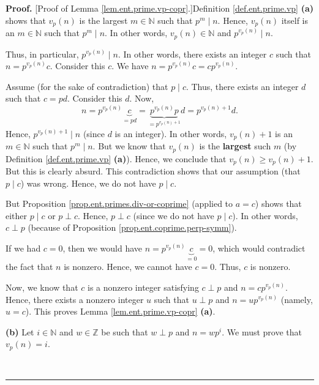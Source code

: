 \documentclass[numbers=enddot,12pt,final,onecolumn,notitlepage]{scrartcl}%
\numberwithin{exer}{subsection}
\theoremstyle{definition}
\newenvironment{proof}[1][Proof]{\noindent\textbf{#1.} }{\ \rule{0.5em}{0.5em}}
\begin{document}
\begin{proof}
[Proof of Lemma \ref{lem.ent.prime.vp-copr}.]Definition \ref{def.ent.prime.vp}
\textbf{(a)} shows that $v_{p}\left(  n\right)  $ is the largest
$m\in\mathbb{N}$ such that $p^{m}\mid n$. Hence, $v_{p}\left(  n\right)  $
itself is an $m\in\mathbb{N}$ such that $p^{m}\mid n$. In other words,
$v_{p}\left(  n\right)  \in\mathbb{N}$ and $p^{v_{p}\left(  n\right)  }\mid n$.

Thus, in particular, $p^{v_{p}\left(  n\right)  }\mid n$. In other words,
there exists an integer $c$ such that $n=p^{v_{p}\left(  n\right)  }c$.
Consider this $c$. We have $n=p^{v_{p}\left(  n\right)  }c=cp^{v_{p}\left(
n\right)  }$.

Assume (for the sake of contradiction) that $p\mid c$. Thus, there exists an
integer $d$ such that $c=pd$. Consider this $d$. Now,%
\[
n=p^{v_{p}\left(  n\right)  }\underbrace{c}_{=pd}=\underbrace{p^{v_{p}\left(
n\right)  }p}_{=p^{v_{p}\left(  n\right)  +1}}d=p^{v_{p}\left(  n\right)
+1}d.
\]
Hence, $p^{v_{p}\left(  n\right)  +1}\mid n$ (since $d$ is an integer). In
other words, $v_{p}\left(  n\right)  +1$ is an $m\in\mathbb{N}$ such that
$p^{m}\mid n$. But we know that $v_{p}\left(  n\right)  $ is the
\textbf{largest} such $m$ (by Definition \ref{def.ent.prime.vp} \textbf{(a)}).
Hence, we conclude that $v_{p}\left(  n\right)  \geq v_{p}\left(  n\right)
+1$. But this is clearly absurd. This contradiction shows that our assumption
(that $p\mid c$) was wrong. Hence, we do not have $p\mid c$.

But Proposition \ref{prop.ent.primes.div-or-coprime} (applied to $a=c$) shows
that either $p\mid c$ or $p\perp c$. Hence, $p\perp c$ (since we do not have
$p\mid c$). In other words, $c\perp p$ (because of Proposition
\ref{prop.ent.coprime.perp-symm}).

If we had $c=0$, then we would have $n=p^{v_{p}\left(  n\right)
}\underbrace{c}_{=0}=0$, which would contradict the fact that $n$ is nonzero.
Hence, we cannot have $c=0$. Thus, $c$ is nonzero.

Now, we know that $c$ is a nonzero integer satisfying $c\perp p$ and
$n=cp^{v_{p}\left(  n\right)  }$. Hence, there exists a nonzero integer $u$
such that $u\perp p$ and $n=up^{v_{p}\left(  n\right)  }$ (namely, $u=c$).
This proves Lemma \ref{lem.ent.prime.vp-copr} \textbf{(a)}.

\textbf{(b)} Let $i\in\mathbb{N}$ and $w\in\mathbb{Z}$ be such that $w\perp p$
and $n=wp^{i}$. We must prove that $v_{p}\left(  n\right)  =i$.


\end{proof}
\end{document}
